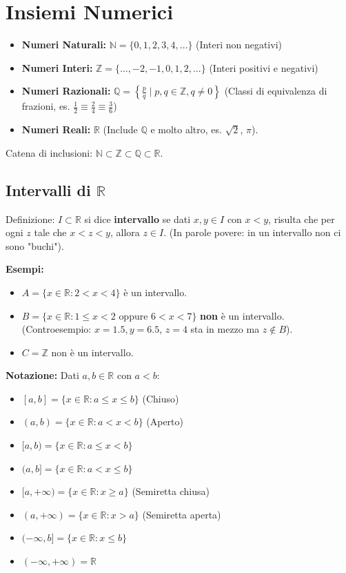 \documentclass{article}
\begin{document}
\section*{Insiemi Numerici}

\begin{itemize}
    \item \textbf{Numeri Naturali:} $\mathbb{N} = \{0, 1, 2, 3, 4, \dots \}$ (Interi non negativi)
    \item \textbf{Numeri Interi:} $\mathbb{Z} = \{ \dots, -2, -1, 0, 1, 2, \dots \}$ (Interi positivi e negativi)
    \item \textbf{Numeri Razionali:} $\mathbb{Q} = \left\{ \frac{p}{q} \mid p, q \in \mathbb{Z}, q \neq 0 \right\}$ (Classi di equivalenza di frazioni, es. $\frac{1}{2} \equiv \frac{2}{4} \equiv \frac{3}{6}$)
    \item \textbf{Numeri Reali:} $\mathbb{R}$ (Include $\mathbb{Q}$ e molto altro, es. $\sqrt{2}$, $\pi$).
\end{itemize}

Catena di inclusioni: $\mathbb{N} \subset \mathbb{Z} \subset \mathbb{Q} \subset \mathbb{R}$.

\subsection*{Intervalli di $\mathbb{R}$}
Definizione: $I \subset \mathbb{R}$ si dice \textbf{intervallo} se dati $x, y \in I$ con $x < y$, risulta che per ogni $z$ tale che $x < z < y$, allora $z \in I$.
(In parole povere: in un intervallo non ci sono "buchi").

\textbf{Esempi:}
\begin{itemize}
    \item $A = \{ x \in \mathbb{R} : 2 < x < 4 \}$ è un intervallo.
    \item $B = \{ x \in \mathbb{R} : 1 \le x < 2 \text{ oppure } 6 < x < 7 \}$ \textbf{non} è un intervallo. (Controesempio: $x=1.5, y=6.5$, $z=4$ sta in mezzo ma $z \notin B$).
    \item $C = \mathbb{Z}$ non è un intervallo.
\end{itemize}

\textbf{Notazione:}
Dati $a, b \in \mathbb{R}$ con $a < b$:
\begin{itemize}
    \item $[a, b] = \{ x \in \mathbb{R} : a \le x \le b \}$ (Chiuso)
    \item $(a, b) = \{ x \in \mathbb{R} : a < x < b \}$ (Aperto)
    \item $[a, b) = \{ x \in \mathbb{R} : a \le x < b \}$
    \item $(a, b] = \{ x \in \mathbb{R} : a < x \le b \}$
    \item $[a, +\infty) = \{ x \in \mathbb{R} : x \ge a \}$ (Semiretta chiusa)
    \item $(a, +\infty) = \{ x \in \mathbb{R} : x > a \}$ (Semiretta aperta)
    \item $(-\infty, b] = \{ x \in \mathbb{R} : x \le b \}$
    \item $(-\infty, +\infty) = \mathbb{R}$
\end{itemize}
\end{document}
